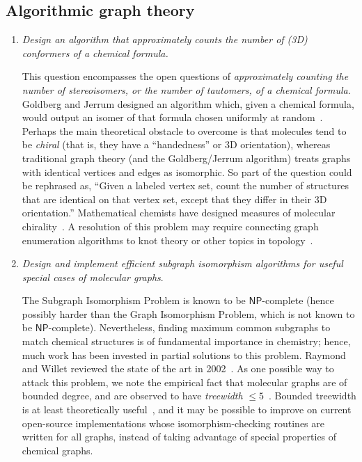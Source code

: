 \documentclass{sig-alternate}
\begin{document}
\subsection*{Algorithmic graph theory}
\begin{enumerate}
\item \emph{Design an algorithm that approximately counts the number of (3D) conformers of a chemical formula.}

  This question encompasses the open questions of \emph{approximately
    counting the number of stereoisomers, or the number of tautomers,
    of a chemical formula}.  Goldberg and Jerrum designed an algorithm
  which, given a chemical formula, would output an isomer of that
  formula chosen uniformly at random~\cite{RandomlySampling}.  Perhaps
  the main theoretical obstacle to overcome is that molecules tend to
  be \emph{chiral} (that is, they have a ``handedness'' or 3D
  orientation), whereas traditional graph theory (and the
  Goldberg/Jerrum algorithm) treats graphs with identical vertices and
  edges as isomorphic.  So part of the question could be rephrased as,
  ``Given a labeled vertex set, count the number of structures that
  are identical on that vertex set, except that they differ in their
  3D orientation.''  Mathematical chemists have designed measures of
  molecular chirality~\cite{ChiralityMeasures}. A resolution of this
  problem may require connecting graph enumeration algorithms to knot
  theory or other topics in topology~\cite{TopologicalLook}.
%
\item \emph{Design and implement efficient subgraph isomorphism
    algorithms for useful special cases of molecular graphs}.

  The Subgraph Isomorphism Problem is known to be
  $\textsf{NP}$-complete (hence possibly harder than the Graph
  Isomorphism Problem, which is not known to be
  $\textsf{NP}$-complete).  Nevertheless, finding maximum common
  subgraphs to match chemical structures is of fundamental importance
  in chemistry; hence, much work has been invested in partial
  solutions to this problem.  Raymond and Willet reviewed the state of
  the art in 2002~\cite{MCSreview}.  As one possible way to attack
  this problem, we note the empirical fact that molecular graphs are
  of bounded degree, and are observed to have \emph{treewidth} $\leq
  5$~\cite{treewidth}.  Bounded treewidth is at least theoretically
  useful~\cite{Epp-JGAA-99}, and it may be possible to improve on
  current open-source implementations whose isomorphism-checking
  routines are written for all graphs, instead of taking advantage of
  special properties of chemical graphs.


\end{enumerate}
\end{document}
